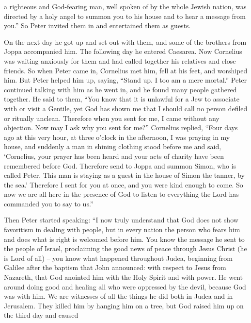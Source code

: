 {a
righteous
and
God-fearing
man,
well spoken of
by
the whole
Jewish
nation,
was directed
by
a
holy
angel
to summon
you
to
his
house
and
to hear
a message
from
you.”
So
Peter invited
them
in
and entertained
them as guests.
\par }{\PP On the next day
he got up
and set out
with
them,
and
some
of the brothers
from
Joppa
accompanied
him.
The following day
he entered
Caesarea.
Now
Cornelius
was
waiting anxiously
for them
and had called together
his
relatives
and
close
friends.
So
when
Peter
came in,
Cornelius
met
him,
fell
at
his feet,
and worshiped him.
But
Peter
helped
him
up,
saying,
“Stand up.
I
too
am
a mere mortal.”
Peter continued talking
with him
as he went in,
and
he found
many people
gathered together.
He said
to
them,
“You
know
that it is
unlawful
for a Jew
to associate
with or
visit
a Gentile,
yet God
has shown
me that I should call
no
person
defiled
or
ritually unclean.
Therefore
when
you sent for
me, I came
without any objection.
Now may I ask
why
you sent for
me?”
Cornelius
replied, “Four
days
ago at this
very hour,
at three o’clock in the afternoon,
I was praying
in
my
house,
and
suddenly
a man
in
shining
clothing
stood
before
me
and
said,
‘Cornelius,
your
prayer
has been heard
and
your
acts of charity
have been remembered
before
God.
Therefore
send
to
Joppa
and
summon
Simon,
who is called
Peter.
This man
is staying as a guest
in
the house
of Simon
the tanner,
by
the sea.’
Therefore
I sent
for
you
at once,
and you
were kind
enough to come.
So
now
we
are
all
here
in the presence of
God
to listen
to everything
the Lord
has commanded
you to say to us.”
\par }{\PP {}Then
Peter
started speaking: “I
now truly
understand
that
God
does
not
show favoritism in dealing with people,
but
in
every
nation
the person who fears
him
and
does
what is right
is
welcomed
before him.
You know the message
he sent
to the people
of Israel,
proclaiming the good news
of peace
through
Jesus
Christ
(he
is
Lord
of all) –
you
know
what happened
throughout
Judea,
beginning
from
Galilee
after
the baptism
that
John
announced:
with respect to Jesus
from
Nazareth,
that God
anointed
him
with
the Holy
Spirit
and
with power.
He went around
doing good
and
healing
all
who were oppressed
by
the devil,
because
God
was
with
him.
We
are witnesses
of all
the things
he did
both
in
Judea
and
in Jerusalem.
They killed
him by hanging
him on
a tree,
but God
raised
him up
on the third
day
and
caused
}
